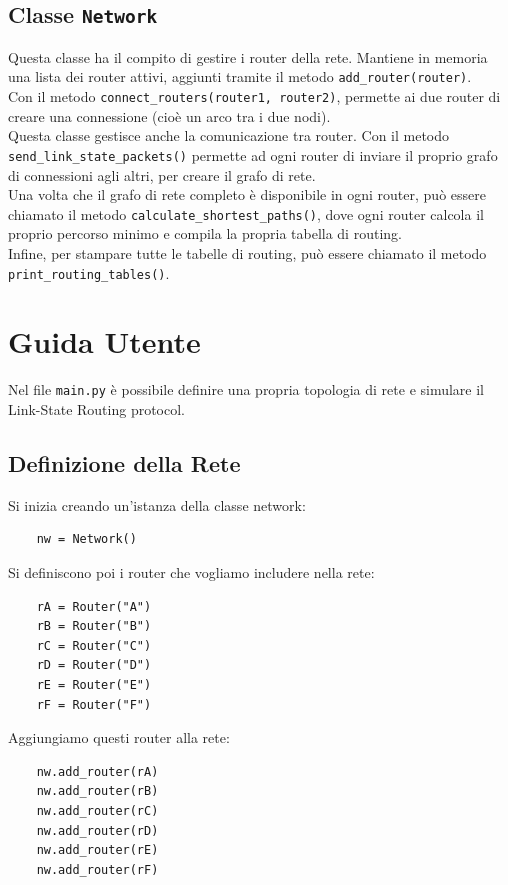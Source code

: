 \documentclass{article}
\begin{document}
\subsection{Classe \texttt{Network}}
Questa classe ha il compito di gestire i router della rete. Mantiene in memoria una lista dei router attivi, aggiunti tramite il metodo \texttt{add\_router(router)}.\\
Con il metodo \texttt{connect\_routers(router1, router2)}, permette ai due router di creare una connessione (cioè un arco tra i due nodi).\\
Questa classe gestisce anche la comunicazione tra router. Con il metodo \texttt{send\_link\_state\_packets()} permette ad ogni router di inviare il proprio grafo di connessioni agli altri, per creare il grafo di rete.\\
Una volta che il grafo di rete completo è disponibile in ogni router, può essere chiamato il metodo \texttt{calculate\_shortest\_paths()}, dove ogni router calcola il proprio percorso minimo e compila la propria tabella di routing.\\
Infine, per stampare tutte le tabelle di routing, può essere chiamato il metodo \texttt{print\_routing\_tables()}.

\newpage

\section{Guida Utente}
Nel file \texttt{main.py} è possibile definire una propria topologia di rete e simulare il Link-State Routing protocol.\\
\subsection{Definizione della Rete}
Si inizia creando un'istanza della classe network:

\begin{lstlisting}
    nw = Network()
\end{lstlisting}

Si definiscono poi i router che vogliamo includere nella rete:
\begin{lstlisting}
    rA = Router("A")
    rB = Router("B")
    rC = Router("C")
    rD = Router("D")
    rE = Router("E")
    rF = Router("F")
\end{lstlisting}

Aggiungiamo questi router alla rete:
\begin{lstlisting}
    nw.add_router(rA)
    nw.add_router(rB)
    nw.add_router(rC)
    nw.add_router(rD)
    nw.add_router(rE)
    nw.add_router(rF)
\end{lstlisting}
\end{document}
